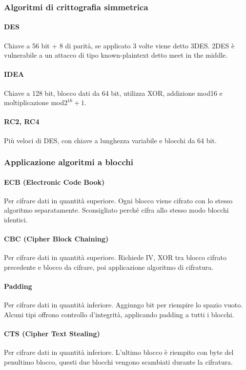 \documentclass[11pt]{article}
\begin{document}
\subsubsection{Algoritmi di crittografia simmetrica}
\paragraph*{DES}
Chiave a 56 bit + 8 di parità, se applicato 3 volte viene detto 3DES. 2DES è vulnerabile a un attacco di tipo known-plaintext
detto meet in the middle.
\paragraph*{IDEA}
Chiave a 128 bit, blocco dati da 64 bit, utilizza XOR, addizione mod16 e moltiplicazione mod$2^{16}+1$.
\paragraph*{RC2, RC4}
Più veloci di DES, con chiave a lunghezza variabile e blocchi da 64 bit.
\subsubsection{Applicazione algoritmi a blocchi}
\paragraph*{ECB (Electronic Code Book)}
Per cifrare dati in quantità superiore. Ogni blocco viene cifrato con lo stesso algoritmo separatamente. Sconsigliato 
perché cifra allo stesso modo blocchi identici.
\paragraph*{CBC (Cipher Block Chaining)}
Per cifrare dati in quantità superiore. Richiede IV, XOR tra blocco cifrato precedente e blocco da cifrare, poi applicazione 
algoritmo di cifratura.
\paragraph*{Padding}
Per cifrare dati in quantità inferiore. Aggiungo bit per riempire lo spazio vuoto. Alcuni tipi offrono controllo d'integrità,
applicando padding a tutti i blocchi.
\paragraph*{CTS (Cipher Text Stealing)}
Per cifrare dati in quantità inferiore. L'ultimo blocco è riempito con byte del penultimo blocco, questi due blocchi 
vengono scambiati durante la cifratura.
\end{document}
